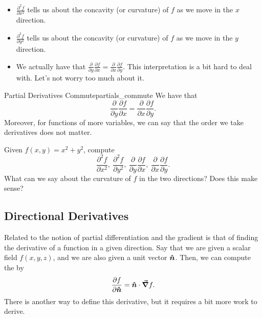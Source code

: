                         \begin{itemize}
                            \item $\frac{\partial^2 f}{\partial x^2}$ tells us about the concavity (or curvature) of $f$ as we move in the $x$ direction.
                            \item $\frac{\partial^2 f}{\partial y^2}$ tells us about the concavity (or curvature) of $f$ as we move in the $y$ direction.
                            \item We actually have that $\frac{\partial}{\partial y}\frac{\partial f}{\partial x}=\frac{\partial}{\partial x}\frac{\partial f}{\partial y}$.  This interpretation is a bit hard to deal with.  Let's not worry too much about it.
                        \end{itemize}
                        
                        \begin{prop}{Partial Derivatives Commute}{partials_commute}
                        We have that
                        \[
                        \frac{\partial}{\partial y}\frac{\partial f}{\partial x}=\frac{\partial}{\partial x}\frac{\partial f}{\partial y}.
                        \]
                        Moreover, for functions of more variables, we can say that the order we take derivatives does not matter.
                        \end{prop}
                        
                        \begin{exercise}
                        Given $f(x,y)=x^2+y^2$, compute
                        \[
                        \frac{\partial^2 f}{\partial x^2}, ~ \frac{\partial^2 f}{\partial y^2}, ~ \frac{\partial}{\partial y}\frac{\partial f}{\partial x},~ \frac{\partial}{\partial x}\frac{\partial f}{\partial y}.
                        \]
                        What can we say about the curvature of $f$ in the two directions? Does this make sense?
                        \end{exercise}
                        
                        \subsection{Directional Derivatives}
                        
                        Related to the notion of partial differentiation and the gradient is that of finding the derivative of a function in a given direction.  Say that we are given a scalar field $f(x,y,z)$, and we are also given a unit vector $\boldsymbol{\hat{n}}$.  Then, we can compute the  by
                        \[
                        \frac{\partial f}{\partial \boldsymbol{\hat{n}}} = \boldsymbol{\hat{n}} \cdot \boldsymbol{\vec{\nabla}} f.
                        \]
                        There is another way to define this derivative, but it requires a bit more work to derive.
                        
